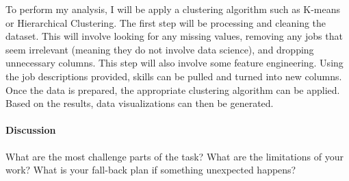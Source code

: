 \documentclass[12pt]{article}
\begin{document}
To perform my analysis, I will be apply a clustering algorithm such as K-means or Hierarchical Clustering. The first
step will be processing and cleaning the dataset. This will involve looking for any missing values, removing any jobs 
that seem irrelevant (meaning they do not involve data science), and dropping unnecessary columns. This step will also involve some 
feature engineering. Using the job descriptions provided, skills can be pulled and turned into new columns. Once the data is 
prepared, the appropriate clustering algorithm can be applied. Based on the results, data visualizations can then be generated.

\paragraph{Discussion}
What are the most challenge parts of the task?
What are the limitations of your work? What is your fall-back plan if
something unexpected happens?

\lipsum[5]



\end{document}
